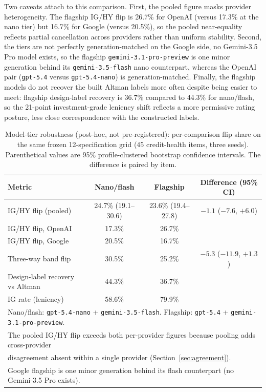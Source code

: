 \documentclass[a4paper,fleqn]{cas-sc}
\begin{document}
Two caveats attach to this comparison. First, the pooled figure masks provider heterogeneity. The flagship IG/HY flip is 26.7\% for OpenAI (versus 17.3\% at the nano tier) but 16.7\% for Google (versus
20.5\%), so the pooled near-equality reflects partial cancellation across providers rather than uniform
stability. Second, the tiers are not perfectly generation-matched on the Google side, no Gemini-3.5 Pro
model exists, so the flagship \texttt{gemini-3.1-pro-preview} is one minor generation behind its
\texttt{gemini-3.5-flash} nano counterpart, whereas the OpenAI pair (\texttt{gpt-5.4} versus
\texttt{gpt-5.4-nano}) is generation-matched. Finally, the flagship models do not recover the built
Altman labels more often despite being easier to meet: flagship design-label recovery is 36.7\% compared to 44.3\% for
nano/flash, so the 21-point investment-grade leniency shift reflects a more permissive rating posture,
less close correspondence with the constructed labels.

\begin{table}[t]\centering
\caption{Model-tier robustness (post-hoc, not pre-registered): per-comparison flip share on the same
frozen 12-specification grid ($45$ credit-health items, three seeds). Parenthetical values are 95\%
profile-clustered bootstrap confidence intervals. The difference is paired by item.}
\label{tab:tier}
\begin{tabular}{lccc}\toprule
Metric & Nano/flash & Flagship & Difference (95\% CI) \\\midrule
IG/HY flip (pooled) & 24.7\% (19.1--30.6) & 23.6\% (19.4--27.8) & $-1.1$ ($-7.6$, $+6.0$) \\
\quad IG/HY flip, OpenAI & 17.3\% & 26.7\% & \\
\quad IG/HY flip, Google & 20.5\% & 16.7\% & \\
Three-way band flip & 30.5\% & 25.2\% & $-5.3$ ($-11.9$, $+1.3$) \\\midrule
Design-label recovery vs Altman & 44.3\% & 36.7\% & \\
IG rate (leniency) & 58.6\% & 79.9\% & \\\midrule
\multicolumn{4}{l}{Nano/flash: \texttt{gpt-5.4-nano} + \texttt{gemini-3.5-flash}. Flagship: \texttt{gpt-5.4} + \texttt{gemini-3.1-pro-preview}.}\\
\multicolumn{4}{l}{The pooled IG/HY flip exceeds both per-provider figures because pooling adds cross-provider}\\
\multicolumn{4}{l}{disagreement absent within a single provider (Section~\ref{sec:agreement}).}\\
\multicolumn{4}{l}{Google flagship is one minor generation behind its flash counterpart (no Gemini-3.5 Pro exists).}\\\bottomrule
\end{tabular}\end{table}
\end{document}
